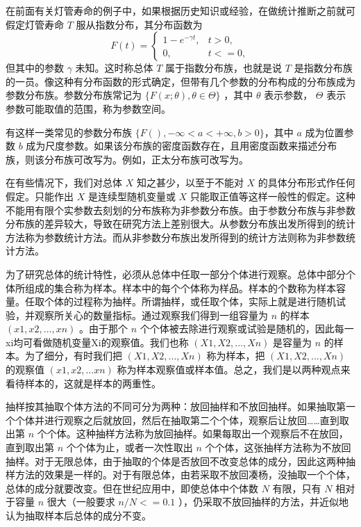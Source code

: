 在前面有关灯管寿命的例子中，如果根据历史知识或经验，在做统计推断之前就可假定灯管寿命
$T$
服从指数分布，其分布函数为
\[
F(t) = 
\begin{cases}
1 - e ^{-\gamma t} , & t> 0, \\
0 , & t<=0,
\end{cases}
\]
但其中的参数
$\gamma$
未知。这时称总体
$T$
属于指数分布族，也就是说
$T$
是指数分布族的一员。像这种有分布函数的形式确定，但带有几个参数的分布构成的分布族成为参数分布族。参数分布族常记为
$\{F(x; \theta), \theta \in \Theta\}$
，其中
$\theta$
表示参数，
$\Theta$
表示参数可能取值的范围，称为参数空间。

有这样一类常见的参数分布族
$\{F(), - \infty < a < + \infty, b > 0 \}$，其中
$a$
成为位置参数
$b$
成为尺度参数。如果该分布族的密度函数存在，且用密度函数来描述分布族，则该分布族可改写为。例如，正太分布族可改写为。

在有些情况下，我们对总体
$X$
知之甚少，以至于不能对
$X$
的具体分布形式作任何假定。只能作出
$X$
是连续型随机变量或
$X$
只能取正值等这样一般性的假定。这种不能用有限个实参数去刻划的分布族称为非参数分布族。由于参数分布族与非参数分布族的差异较大，导致在研究方法上差别很大。从参数分布族出发所得到的统计方法称为参数统计方法。而从非参数分布族出发所得到的统计方法则称为非参数统计方法。

为了研究总体的统计特性，必须从总体中任取一部分个体进行观察。总体中部分个体所组成的集合称为样本。样本中的每个个体称为样品。样本的个数称为样本容量。任取个体的过程称为抽样。所谓抽样，或任取个体，实际上就是进行随机试验，并观察所关心的数量指标。通过观察我们得到一组容量为
$n$
的样本
$(x1,x2,...,xn)$
。由于那个
$n$
个个体被去除进行观察或试验是随机的，因此每一xi均可看做随机变量Xi的观察值。我们也称
$(X1,X2,...,Xn)$
是容量为
$n$
的样本。为了细分，有时我们把
$(X1,X2,...,Xn)$
称为样本，把
$(X1,X2,...,Xn)$
的观察值
$(x1,x2,...xn)$
称为样本观察值或样本值。总之，我们是以两种观点来看待样本的，这就是样本的两重性。

抽样按其抽取个体方法的不同可分为两种：放回抽样和不放回抽样。如果抽取第一个个体并进行观察之后就放回，然后在抽取第二个个体，观察后让放回……直到取出第
$n$
个个体。这种抽样方法称为放回抽样。如果每取出一个观察后不在放回，直到取出第
$n$
个个体为止，或者一次性取出
$n$
个个体，这张抽样方法称为不放回抽样。对于无限总体，由于抽取的个体是否放回不改变总体的成分，因此这两种抽样方法的效果是一样的。对于有限总体，由若采取不放回凑杨，没抽取一个个体，总体的成分就要改变。但在世纪应用中，即使总体中个体数
$N$
有限，只有
$N$
相对于容量
$n$
很大（一般要求
$n/N<=0.1$
），仍采取不放回抽样的方法，并近似地认为抽取样本后总体的成分不变。

